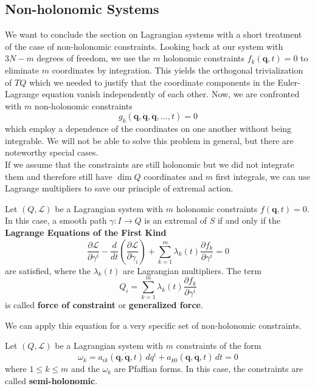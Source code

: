 \subsection*{Non-holonomic Systems}
We want to conclude the section on Lagrangian systems with a short treatment of the case of non-holonomic constraints. Looking back at our system with $3N-m$ degrees of freedom, we use the $m$ holonomic constraints $f_k(\mathbf{q},t)=0$ to eliminate $m$ coordinates by integration. This yields the orthogonal trivialization of $TQ$ which we needed to justify that the coordinate components in the Euler-Lagrange equation vanish independently of each other. Now, we are confronted with $m$ non-holonomic constraints \[
g_k(\mathbf{q}, \dot{\mathbf{q}}, \ddot{\mathbf{q}}, \dots, t)=0
\] which employ a dependence of the coordinates on one another without being integrable. We will not be able to solve this problem in general, but there are noteworthy special cases.\\
If we assume that the constraints are still holonomic but we did not integrate them and therefore still have $\dim Q$ coordinates and $m$ first integrals, we can use Lagrange multipliers to save our principle of extremal action.
\begin{theorem}
    Let $(Q, \mathcal{L})$ be a Lagrangian system with $m$ holonomic constraints $f(\mathbf{q},t)=0$. In this case, a smooth path $\gamma: I \to Q$ is an extremal of $S$ if and only if the \textbf{Lagrange Equations of the First Kind}
    \[
        \frac{\partial \mathcal{L}}{\partial \gamma^i} - \frac{d}{dt} \left( \frac{\partial \mathcal{L}}{\partial \dot{\gamma}_i}\right) + \sum_{k=1}^m \lambda_k(t) \frac{\partial f_k}{\partial \gamma^i}=0
    \] are satisfied, where the $\lambda_k(t)$ are Lagrangian multipliers. The term 
    \[
        Q_i = \sum_{k=1}^m \lambda_k(t) \frac{\partial f_k}{\partial \gamma^i}
    \] is called \textbf{force of constraint} or \textbf{generalized force}. 
\end{theorem}
We can apply this equation for a very specific set of non-holonomic constraints.
\begin{definition}
    Let $(Q, \mathcal{L})$ be a Lagrangian system with $m$ constraints of the form 
    \[
        \omega_k = a_{ik}(\mathbf{q},\dot{\mathbf{q}},t) \, dq^i + a_{k0}(\mathbf{q},\dot{\mathbf{q}},t) \, dt = 0
    \] where $1 \leq k \leq m$ and the $\omega_k$ are Pfaffian forms. In this case, the constraints are called \textbf{semi-holonomic}.  
\end{definition}
